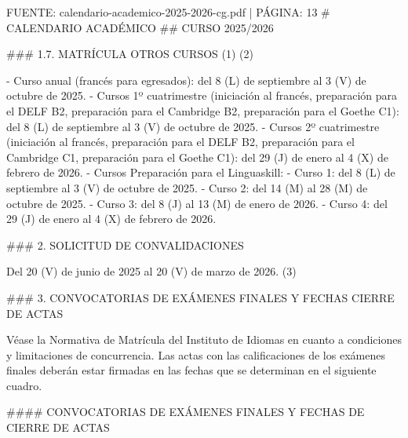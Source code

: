 \documentclass{article}
\begin{document}
\begin{itemize}
\begin{itemize}
\begin{scriptsize}
                  FUENTE: calendario-academico-2025-2026-cg.pdf | PÁGINA: 13
                  \# CALENDARIO ACADÉMICO
                  \#\# CURSO 2025/2026

                  \#\#\# 1.7. MATRÍCULA OTROS CURSOS (1) (2)

                  - Curso anual (francés para egresados): del 8 (L) de septiembre al 3 (V) de octubre de 2025.
                  - Cursos 1º cuatrimestre (iniciación al francés, preparación para el DELF B2, preparación para el Cambridge B2, preparación para el Goethe C1): del 8 (L) de septiembre al 3 (V) de octubre de 2025.
                  - Cursos 2º cuatrimestre (iniciación al francés, preparación para el DELF B2, preparación para el Cambridge C1, preparación para el Goethe C1): del 29 (J) de enero al 4 (X) de febrero de 2026.
                  - Cursos Preparación para el Linguaskill:
                  - Curso 1: del 8 (L) de septiembre al 3 (V) de octubre de 2025.
                  - Curso 2: del 14 (M) al 28 (M) de octubre de 2025.
                  - Curso 3: del 8 (J) al 13 (M) de enero de 2026.
                  - Curso 4: del 29 (J) de enero al 4 (X) de febrero de 2026.

                  \#\#\# 2. SOLICITUD DE CONVALIDACIONES

                  Del 20 (V) de junio de 2025 al 20 (V) de marzo de 2026. (3)

                  \#\#\# 3. CONVOCATORIAS DE EXÁMENES FINALES Y FECHAS CIERRE DE ACTAS

                  Véase la Normativa de Matrícula del Instituto de Idiomas en cuanto a condiciones y limitaciones de concurrencia. Las actas con las calificaciones de los exámenes finales deberán estar firmadas en las fechas que se determinan en el siguiente cuadro.

                  \#\#\#\# CONVOCATORIAS DE EXÁMENES FINALES Y FECHAS DE CIERRE DE ACTAS


\end{scriptsize}
\end{itemize}
\end{itemize}
\end{document}
